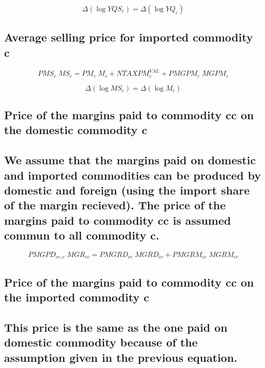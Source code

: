 \documentclass[12pt]{article}
\numberwithin{equation}{section}
\begin{document}
\begin{dmath}
\varDelta \left(\operatorname{log} YQS_{c}\right) = \varDelta \left(\operatorname{log} YQ_{c}\right)
\end{dmath}



\subsection{Average selling price for imported commodity c}


\begin{dmath}
PMS_{c} \; MS_{c} = PM_{c} \; M_{c} + NTAXPM^{VAL}_{c} + PMGPM_{c} \; MGPM_{c}
\end{dmath}

\begin{dmath}
\varDelta \left(\operatorname{log} MS_{c}\right) = \varDelta \left(\operatorname{log} M_{c}\right)
\end{dmath}



\subsection{Price of the margins paid to commodity cc on the domestic commodity c}




\subsection{We assume that the margins paid on domestic and imported commodities can be produced by domestic and foreign (using the import share of the margin recieved). The price of the margins paid to commodity cc is assumed commun to all commodity c.}


\begin{dmath}
PMGPD_{cc, c} \; MGR_{cc} = PMGRD_{cc} \; MGRD_{cc} + PMGRM_{cc} \; MGRM_{cc}
\end{dmath}



\subsection{Price of the margins paid to commodity cc on the imported commodity c}




\subsection{This price is the same as the one paid on domestic commodity because of the assumption given in the previous equation.}
\end{document}
